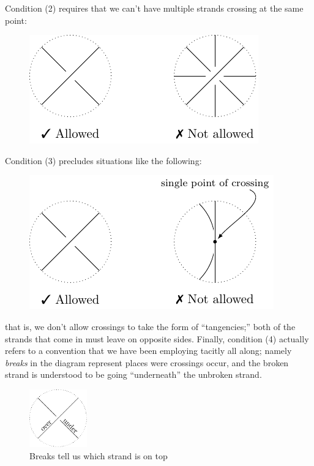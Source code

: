 Condition (2) requires that we can't have multiple strands crossing at
the same point: %
\begin{figure}[H]
  \centering
  \includegraphics{figures/background/single_cross.pdf}
\end{figure}
Condition (3) precludes situations like the following:
\begin{figure}[H]
  \centering
  \includegraphics{figures/background/x_cross.pdf}
\end{figure}
\noindent that is, we don't allow crossings to take the form of
``tangencies;'' both of the strands that come in must leave on
opposite sides. Finally, condition (4) actually refers to a convention
that we have been employing tacitly all along; namely \emph{breaks} in
the diagram represent places were crossings occur, and the broken
strand is understood to be going ``underneath'' the unbroken strand.
\begin{figure}[H]
  \begin{center}
    \includegraphics[width=2.5cm]{figures/background/uo_cross.pdf}
  \end{center}
  \caption{Breaks tell us which strand is on top}
\end{figure}
